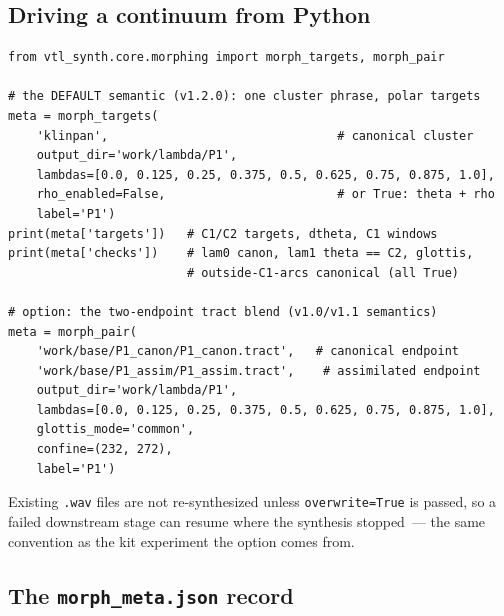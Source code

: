 \documentclass[11pt,a4paper]{article}
\newcommand{\code}[1]{\texttt{#1}}
\begin{document}
\subsection{Driving a continuum from Python}

\begin{lstlisting}[style=python]
from vtl_synth.core.morphing import morph_targets, morph_pair

# the DEFAULT semantic (v1.2.0): one cluster phrase, polar targets
meta = morph_targets(
    'klinpan',                                # canonical cluster
    output_dir='work/lambda/P1',
    lambdas=[0.0, 0.125, 0.25, 0.375, 0.5, 0.625, 0.75, 0.875, 1.0],
    rho_enabled=False,                        # or True: theta + rho
    label='P1')
print(meta['targets'])   # C1/C2 targets, dtheta, C1 windows
print(meta['checks'])    # lam0 canon, lam1 theta == C2, glottis,
                         # outside-C1-arcs canonical (all True)

# option: the two-endpoint tract blend (v1.0/v1.1 semantics)
meta = morph_pair(
    'work/base/P1_canon/P1_canon.tract',   # canonical endpoint
    'work/base/P1_assim/P1_assim.tract',    # assimilated endpoint
    output_dir='work/lambda/P1',
    lambdas=[0.0, 0.125, 0.25, 0.375, 0.5, 0.625, 0.75, 0.875, 1.0],
    glottis_mode='common',
    confine=(232, 272),
    label='P1')
\end{lstlisting}

Existing \code{.wav} files are not re-synthesized unless
\code{overwrite=True} is passed, so a failed downstream stage can
resume where the synthesis stopped~--- the same convention as the
kit experiment the option comes from.

\subsection{The \code{morph\_meta.json} record}
\end{document}
